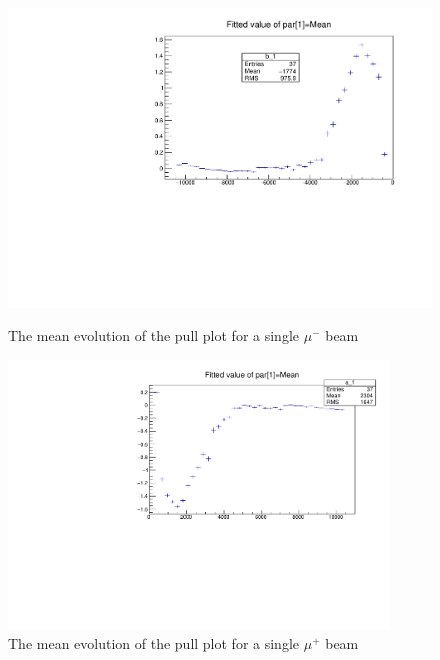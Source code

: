 \begin{figure}[h!]
	\begin{minipage}{0.49\linewidth}
		\centerline{\includegraphics[width=0.9\linewidth]{figures/mumean.pdf}}
			\caption[]{The mean evolution of the pull plot for a single $\mu^-$ beam}
		\label{fig:meanmu}
	\end{minipage}
	\hfill
	\begin{minipage}{0.49\linewidth}
		\centerline{\includegraphics[width=0.9\textwidth]{figures/antimumean.pdf}}
		\caption[]{The mean evolution of the pull plot for a single $\mu^+$ beam}
		\label{fig:meanantimu}
	\end{minipage}
\end{figure}

